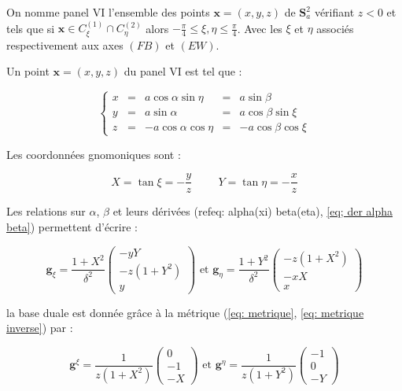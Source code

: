 \begin{definition}
On nomme panel VI l'ensemble des points $\mathbf{x}=(x,y,z)$ de $\mathbf{S}_a^2$ vérifiant $z<0$ et tels que si $\mathbf{x} \in C_{\xi}^{(1)} \cap C_{\eta}^{(2)}$ alors $-\frac{\pi}{4}\leq \xi,\eta \leq \frac{\pi}{4}$. Avec les $\xi$ et $\eta$ associés respectivement aux axes $(FB)$ et $(EW)$.
\end{definition}

Un point $\mathbf{x}=(x,y,z)$ du panel VI est tel que :

\begin{equation}
\left\lbrace
\begin{array}{rcccc}
x & = & a \cos \alpha \sin \eta & = & a \sin \beta \\
y & = & a \sin \alpha & = & a \cos \beta \sin \xi \\
z & = & - a \cos \alpha \cos \eta & = & - a \cos \beta \cos \xi
\end{array}
\right.
\end{equation}

Les coordonnées gnomoniques sont :

\begin{equation}
X = \tan \xi = -\dfrac{y}{z} \hspace{1cm} Y = \tan \eta = -\dfrac{x}{z}
\end{equation}

Les relations sur $\alpha$, $\beta$ et leurs dérivées (ref{eq: alpha(xi) beta(eta)}, \ref{eq; der alpha beta}) permettent d'écrire :

\begin{equation}
\mathbf{g}_{\xi} = \dfrac{1+X^2}{\delta^2} \begin{pmatrix}
-yY \\ -z(1+Y^2) \\ y
\end{pmatrix} \text{ et } \mathbf{g}_{\eta} = \dfrac{1+Y^2}{\delta^2} \begin{pmatrix}
-z(1+X^2) \\ -xX \\ x
\end{pmatrix}
\label{eq: base locale VI}
\end{equation}

la base duale est donnée grâce à la métrique (\ref{eq: metrique}, \ref{eq: metrique inverse}) par :

\begin{equation}
\mathbf{g}^{\xi} = \dfrac{1}{z(1+X^2)}\begin{pmatrix}
0 \\ -1 \\ -X
\end{pmatrix} \text{ et } \mathbf{g}^{\eta} = \dfrac{1}{z(1+Y^2)}\begin{pmatrix}
-1 \\ 0 \\ -Y
\end{pmatrix}
\label{eq: base duale VI}
\end{equation}


